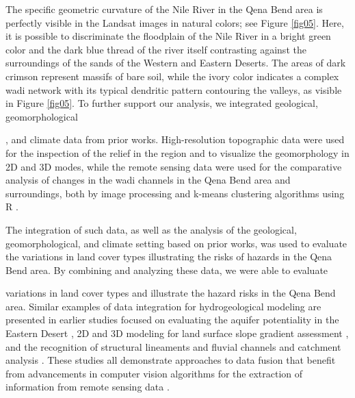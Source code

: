 \documentclass[information,article,accept,pdftex,moreauthors]{Definitions/mdpi}
\begin{document}
The specific geometric curvature of the Nile River in {the }Qena Bend area is perfectly visible in the Landsat images in natural colors; see Figure \ref{fig05}. Here, it is possible to discriminate the floodplain of the Nile River in a bright green color and the dark blue thread of the river itself contrasting against the surroundings of the sands of the Western and Eastern Deserts. The areas of dark crimson represent massifs of bare soil{, while the }ivory color indicates a complex wadi network with its typical dendritic pattern contouring the valleys, as visible in Figure \ref{fig05}. To further support our analysis, we integrated geological, geomorphological{, and climate data from prior works. High-resolution topographic data were used for the inspection of the relief in the region and to visualize the geomorphology in 2D and 3D modes, while the remote sensing data were used for the comparative analysis of changes in the wadi channels in the Qena Bend area and surroundings{, both }by image processing and k-means clustering algorithms using R \cite{RCoreTeam}. 

The integration of such data, as well as the analysis of the geological, geomorphological, and climate setting based on prior works, was used to evaluate the variations in land cover types illustrating the risks of hazards in the Qena Bend area. By combining and analyzing these data, we were able to evaluate }variations in land cover types {and illustrate the hazard risks }in the Qena Bend area. {Similar examples of data integration for hydrogeological modeling are presented in earlier studies focused on evaluating the aquifer potentiality in the Eastern Desert} \cite{Moneim,ELHAMEED2017218}, 2D and 3D modeling for land surface slope gradient assessment \cite{Othman}, and the recognition of structural lineaments and fluvial channels and catchment analysis \cite{rs12101559}. {These studies all demonstrate approaches to data fusion that benefit from advancements in computer vision algorithms for the extraction of} information from remote sensing data \cite{AZZAZY2022104805}.
\end{document}
